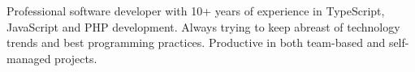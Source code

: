 


\begin{cvparagraph}

Professional software developer with 10+ years of experience in TypeScript, JavaScript and PHP development.
Always trying to keep abreast of technology trends and best programming practices.
Productive in both team-based and self-managed projects.
\end{cvparagraph}
\vspace{-2mm}
